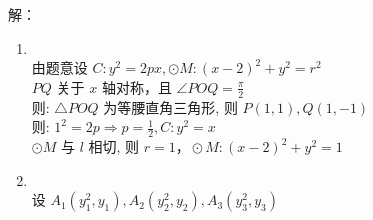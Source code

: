 \documentclass[class=ctexart,crop=false]{standalone}
\begin{document}
解：
\begin{enumerate}[label=(\arabic*)]
      \item \quad\\
            由题意设 $C:y^2=2px,\odot M:(x-2)^2+y^2=r^2$\\
            $PQ$ 关于 $x$ 轴对称，且 $\angle POQ=\frac{\pi}{2}$\\
            则: $\triangle POQ$ 为等腰直角三角形, 则 $P(1,1),Q(1,-1)$\\
            则: $1^2=2p\Rightarrow p=\frac{1}{2},C:y^2=x$\\
            $\odot M$ 与 $l$ 相切, 则 $r=1，\odot M:(x-2)^2+y^2=1$
      \item \quad\\
            设 $A_1(y_1^2,y_1),A_2(y_2^2,y_2),A_3(y_3^2,y_3)$\\

\end{enumerate}
\end{document}
